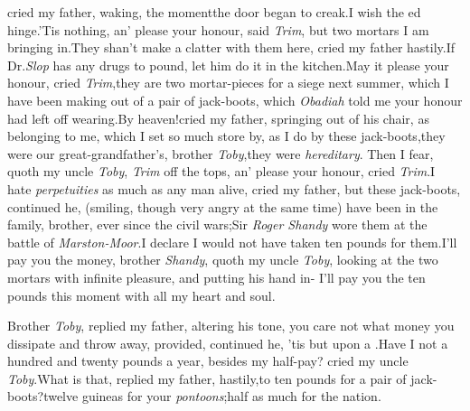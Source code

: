 \documentclass{article}
\begin{document}
\noindent
{}
cried my father, waking, the moment\break the door began to creak.\tsh I wish the
ed hinge.\tsh ’Tis nothing, an’ please your honour, said
\textit{Trim}, but two mortars I am bringing in.\tsh They
shan’t make a clatter with them here, cried my father
hastily.\tsh If Dr.\@ \textit{Slop} has any
drugs to pound, let him do it in the\break
kitchen.\tsk May it please
your honour, cried \textit{Trim},\tsk they are two mortar-pieces for
a siege next summer, which I have been making out of a pair of
jack-boots, which \textit{Obadiah} told me your honour had left
off wearing.\tsk By heaven!\@ cried my father, springing out of
his chair, as\break
{} belonging
to me, which I set so much store by, as I do by these
jack-boots,\break\tsh they were our great-grandfather’s, brother
\textit{Toby},\tsk they were \textit{hereditary}.\break
Then I fear, quoth my uncle \textit{Toby}, \textit{Trim}
off the tops, an’ please your honour,\break
cried \textit{Trim}.\tsh I hate \textit{perpetuities} as much\break
as any man alive, cried my father,\break
\tsh but these jack-boots, continued he, (smiling,
though very angry at the same time) have been in the family,
brother, ever since the civil wars;\tsk Sir \textit{Roger
Sha\-ndy} wore them at the battle of \textit{Marston-Moor}.\tsk I
declare I would not have taken ten pounds for them.\tsh I’ll pay
you the money, brother \textit{Shandy}, quoth my uncle
\textit{Toby}, looking at the two mortars with infinite
pleasure, and putting his hand in-\break
{}\break
\tsh I’ll pay you the ten pounds this moment with all
my heart and soul.\tsh

Brother \textit{Toby}, replied my father, altering his tone, you
care not what money you dissipate and throw away, provided,
continued he, ’tis but upon a
.\tsh Have I not a hundred and
twenty pounds a year, besides my half-pay? cried my uncle
\textit{Toby}.\tsh What is that, replied my father,
hastily,\tsk to ten pounds for a pair of jack-boots?\tsh twelve
guineas for your \textit{pontoons};\tsk half as much
for
\sic\break
{}
the nation.\tsk
\end{document}
